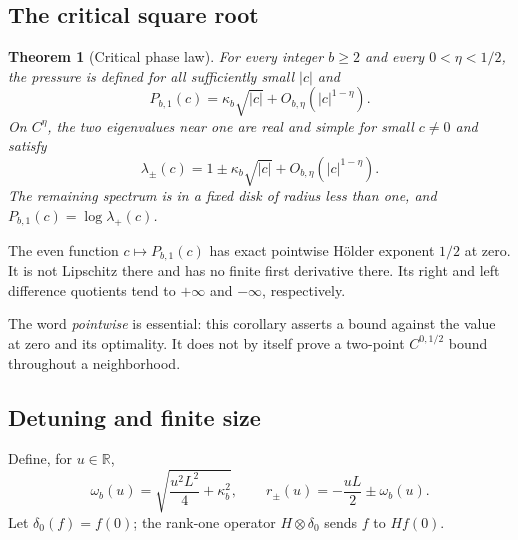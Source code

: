 \documentclass[11pt,a4paper]{article}
\numberwithin{equation}{section}
\newtheorem{theorem}{Theorem}[section]
\theoremstyle{definition}
\theoremstyle{remark}
\newcommand{\RR}{\mathbb R}
\begin{document}
\subsection{The critical square root}
\begin{theorem}[Critical phase law]
\label{thm:critical}
For every integer $b\ge2$ and every $0<\eta<1/2$, the pressure is defined
for all sufficiently small $|c|$ and
\begin{equation}
 P_{b,1}(c)=\kappa_b\sqrt{|c|}
             +O_{b,\eta}(|c|^{1-\eta}).
 \label{eq:critical}
\end{equation}
On $C^\eta$, the two eigenvalues near one are real and simple for small
$c\ne0$ and satisfy
\begin{equation}
 \lambda_\pm(c)=1\pm\kappa_b\sqrt{|c|}
                   +O_{b,\eta}(|c|^{1-\eta}).
 \label{eq:critical-eigenvalues}
\end{equation}
The remaining spectrum is in a fixed disk of radius less than one, and
$P_{b,1}(c)=\log\lambda_+(c)$.
\end{theorem}

\begin{corollary}
\label{cor:holder}
The even function $c\mapsto P_{b,1}(c)$ has exact pointwise H\"older
exponent $1/2$ at zero. It is not Lipschitz there and has no finite
first derivative there. Its right and left difference quotients tend to
$+\infty$ and $-\infty$, respectively.
\end{corollary}
The word \emph{pointwise} is essential: this corollary asserts a bound
against the value at zero and its optimality. It does not by itself prove
a two-point $C^{0,1/2}$ bound throughout a neighborhood.

\subsection{Detuning and finite size}
Define, for $u\in\RR$,
\begin{equation}
 \omega_b(u)=\sqrt{\frac{u^2L^2}{4}+\kappa_b^2},\qquad
 r_\pm(u)=-\frac{uL}{2}\pm\omega_b(u).
 \label{eq:crossover-functions}
\end{equation}
Let $\delta_0(f)=f(0)$; the rank-one operator $H\otimes\delta_0$ sends
$f$ to $Hf(0)$.
\end{document}
